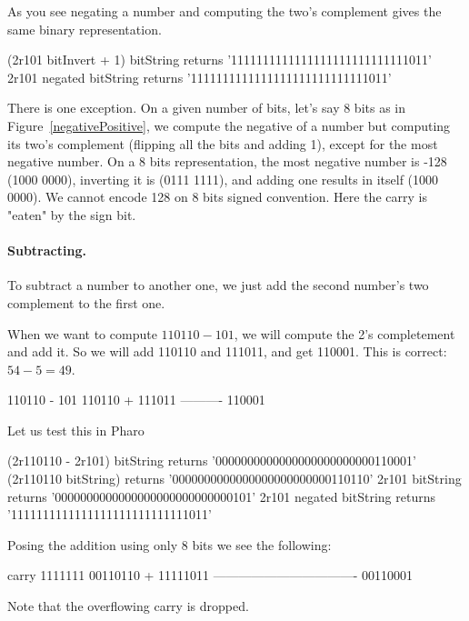 \documentclass[a4paper,10pt,twoside]{book}
\begin{document}
As you see negating a number and computing the two's complement gives the same binary representation.
\begin{code}{}
(2r101 bitInvert + 1) bitString
	returns '1111111111111111111111111111011'	
2r101 negated bitString
	returns '1111111111111111111111111111011'	
\end{code}

There is one exception. On a given number of bits, let's say 8 bits as in Figure~\ref{negativePositive},
we compute the negative of a number but computing its two's complement (flipping all the bits and adding 1), except for the most negative number. On a 8 bits representation, the most negative number is -128 (1000 0000), inverting it is (0111 1111), and adding one results in itself (1000 0000). We cannot encode 128 on 8 bits signed convention. Here the carry is "eaten" by the sign bit. 


\paragraph{Subtracting.}
To subtract a number to another one, we just add the second number's two complement to the first one.

When we want to compute $110110 - 101$, we will compute the 2's completement and add it. 
So we will add 110110 and 111011, and get 110001. This is correct: $54 - 5 = 49$.


\begin{code}{}
110110 - 101
   110110
+ 111011
----------
   110001
\end{code}

Let us test this in Pharo
\begin{code}{}
(2r110110 - 2r101) bitString	
	returns '0000000000000000000000000110001'
(2r110110 bitString) 	
	returns '0000000000000000000000000110110'
2r101 bitString
	returns '0000000000000000000000000000101'		
2r101 negated bitString
	returns '1111111111111111111111111111011'	
\end{code}
	
Posing the addition using only 8 bits we see the following:

\begin{code}{}
carry	1111111 
		 00110110
+		11111011	
	----------------------------------
		 00110001	
\end{code}

Note that the overflowing carry is dropped.
\end{document}
